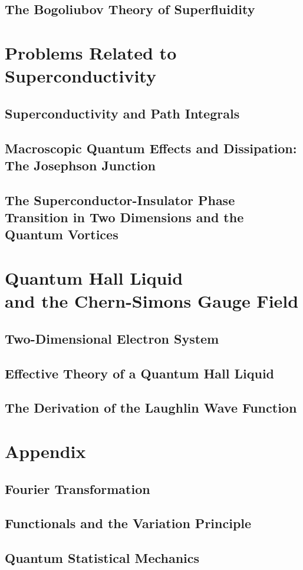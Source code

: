\documentclass[twoside,11pt]{report}
\begin{document}
\section{The Bogoliubov Theory of Superfluidity}
\chapter{Problems Related to Superconductivity}
\section{Superconductivity and Path Integrals}
\section{Macroscopic Quantum Effects and Dissipation: The Josephson Junction}
\section{The Superconductor-Insulator Phase Transition in Two Dimensions and the Quantum Vortices}
\chapter{Quantum Hall Liquid\\ and the Chern-Simons Gauge Field}
\section{Two-Dimensional Electron System}
\section{Effective Theory of a Quantum Hall Liquid}
\section{The Derivation of the Laughlin Wave Function}
\appendix
\chapter{Appendix}
\section{Fourier Transformation}
\section{Functionals and the Variation Principle}
\section{Quantum Statistical Mechanics}


\renewcommand{\bibname}{References}


\end{document}
